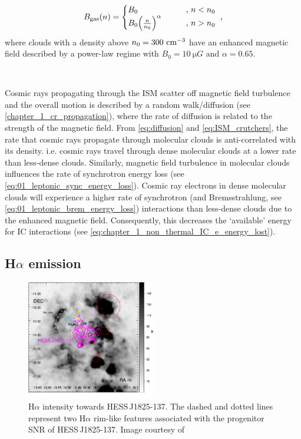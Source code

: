 \begin{equation}
    \begin{aligned}
        B_\text{gas}\qty(n)=
    \begin{cases}
        B_0 \qquad &\text{, } n < n_0 \\
        B_0\qty(\frac{n}{n_0})^\alpha \qquad &\text{, } n > n_0
    \end{cases}\text{ ,}
    \end{aligned} \label{eq:ISM_crutchers}
\end{equation}
\noindent where clouds with a density above $n_0=300~\si{\per\centi\meter\cubed}$ have an enhanced magnetic field described by a power-law regime with $B_0=10~\si{\micro G}$ and $\alpha=0.65$.
\par~\par 
Cosmic rays propagating through the ISM scatter off magnetic field turbulence and the overall motion is described by a random walk/diffusion (see \autoref{chapter_1_cr_propagation}), where the rate of diffusion is related to the strength of the magnetic field. From \autoref{eq:diffusion} and \autoref{eq:ISM_crutchers}, the rate that cosmic rays propagate through molecular clouds is anti-correlated with its density. i.e. cosmic rays travel through dense molecular clouds at a lower rate than less-dense clouds. Similarly, magnetic field turbulence in molecular clouds influences the rate of synchrotron energy loss (see \autoref{eq:01_leptonic_sync_energy_loss}). Cosmic ray electrons in dense molecular clouds will experience a higher rate of synchrotron (and Bremsstrahlung, see \autoref{eq:01_leptonic_brem_energy_loss}) interactions than less-dense clouds due to the enhanced magnetic field. Consequently, this decreases the `available' energy for IC interactions (see \autoref{eq:chapter_1_non_thermal_IC_e_energy_lost}). 

\subsection{H$\alpha$ emission}

\begin{figure}
	\centering
	\includegraphics[width=0.5\textwidth]{06_Interstellar_Medium/Images/Theory/Fabien_Halpha.pdf}
	\caption{H$\alpha$ intensity towards \mbox{HESS\,J1825-137}. The dashed and dotted lines represent two H$\alpha$ rim-like features associated with the progenitor SNR of \mbox{HESS\,J1825-137}. Image courtesy of \citep{2016MNRAS.458.2813V}}
	\label{fig:06_1825_SNR}
\end{figure}

